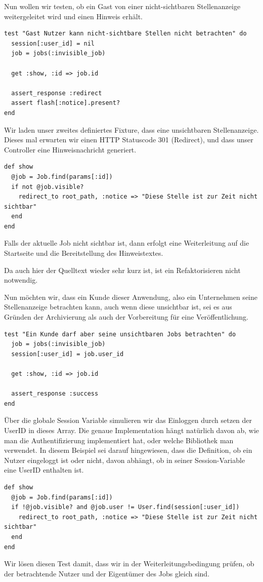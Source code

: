 Nun wollen wir testen, ob ein Gast von einer nicht-sichtbaren Stellenanzeige weitergeleitet wird und einen Hinweis erhält.
\begin{lstlisting}
test "Gast Nutzer kann nicht-sichtbare Stellen nicht betrachten" do
  session[:user_id] = nil
  job = jobs(:invisible_job)
  
  get :show, :id => job.id

  assert_response :redirect
  assert flash[:notice].present?
end
\end{lstlisting}
Wir laden unser zweites definiertes Fixture, dass eine unsichtbaren Stellenanzeige. Dieses mal erwarten wir einen HTTP Statuscode 301 (Redirect), und dass unser Controller eine Hinweisnachricht generiert.

\begin{lstlisting}
def show
  @job = Job.find(params[:id])
  if not @job.visible?
    redirect_to root_path, :notice => "Diese Stelle ist zur Zeit nicht sichtbar"
  end
end
\end{lstlisting}
Falls der aktuelle Job nicht sichtbar ist, dann erfolgt eine Weiterleitung auf die Startseite und die Bereitstellung des Hinweistextes.

Da auch hier der Quelltext wieder sehr kurz ist, ist ein Refaktorisieren nicht notwendig.

Nun möchten wir, dass ein Kunde dieser Anwendung, also ein Unternehmen seine Stellenanzeige betrachten kann, auch wenn diese unsichtbar ist, sei es aus Gründen der Archivierung als auch der Vorbereitung für eine Veröffentlichung.
\begin{lstlisting}
test "Ein Kunde darf aber seine unsichtbaren Jobs betrachten" do
  job = jobs(:invisible_job)
  session[:user_id] = job.user_id
  
  get :show, :id => job.id

  assert_response :success
end
\end{lstlisting}
Über die globale Session Variable simulieren wir das Einloggen durch setzen der UserID in dieses Array. Die genaue Implementation hängt natürlich davon ab, wie man die Authentifizierung implementiert hat, oder welche Bibliothek man verwendet. In diesem Beispiel sei darauf hingewiesen, dass die Definition, ob ein Nutzer eingeloggt ist oder nicht, davon abhängt, ob in seiner Session-Variable eine UserID enthalten ist.

\begin{lstlisting}
def show
  @job = Job.find(params[:id])
  if !@job.visible? and @job.user != User.find(session[:user_id])
    redirect_to root_path, :notice => "Diese Stelle ist zur Zeit nicht sichtbar"
  end
end
\end{lstlisting}
Wir lösen diesen Test damit, dass wir in der Weiterleitungsbedingung prüfen, ob der betrachtende Nutzer und der Eigentümer des Jobs gleich sind.

